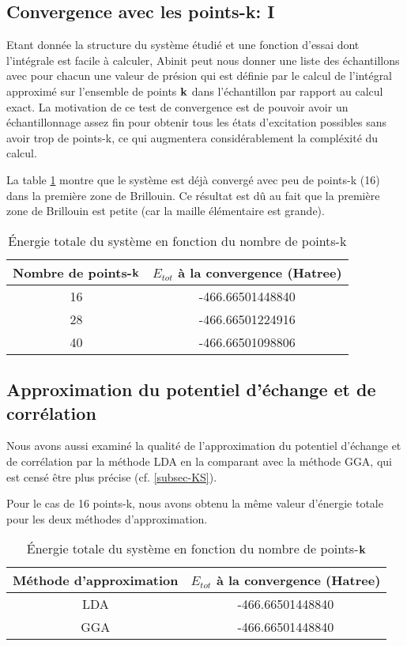 \subsection{Convergence avec les points-k: I}
Etant donnée la structure du système étudié et une fonction d'essai dont l'intégrale est facile à calculer,
Abinit peut nous donner une liste des échantillons avec pour chacun une valeur de présion
qui est définie par le calcul de l'intégral approximé sur l'ensemble de points $\vb{k}$ dans l'échantillon
par rapport au calcul exact.
La motivation de ce test de convergence est de pouvoir avoir un échantillonnage
assez fin pour obtenir tous les états d'excitation possibles sans avoir trop de points-k,
ce qui augmentera considérablement la compléxité du calcul.

La table \cref{tab-etotPK} montre que le système est déjà convergé avec peu de points-k (16) dans la première zone de Brillouin.
Ce résultat est dû au fait que la première zone de Brillouin est petite (car la maille élémentaire est grande).
\begin{table}[ht]\label{tab-etotPK}
\caption{Énergie totale du système en fonction du nombre de points-k}
\centering
\begin{tabular}{c c}
\toprule
Nombre de points-$\vb{k}$  &  $E_{tot}$ à la convergence (Hatree)
\\
\midrule
16    &  -466.66501448840
\\
28    &  -466.66501224916
\\
40    &  -466.66501098806
\\
\bottomrule
\end{tabular}
\end{table}

\subsection{Approximation du potentiel d'échange et de corrélation}
Nous avons aussi examiné la qualité de l'approximation du potentiel d'échange et de corrélation
par la méthode LDA en la comparant avec la méthode GGA,
qui est censé être plus précise (cf. \cref{subsec-KS}).

Pour le cas de 16 points-k, nous avons obtenu la même valeur d'énergie totale pour les deux méthodes d'approximation.

\begin{table}[ht]\label{etotPK}
\caption{Énergie totale du système en fonction du nombre de points-$\vb{k}$}
\centering
\begin{tabular}{c c}
\toprule
Méthode d'approximation &  $E_{tot}$ à la convergence (Hatree)
\\
\midrule
LDA    &  -466.66501448840
\\
GGA   &   -466.66501448840
\\
\bottomrule
\end{tabular}
\end{table}

